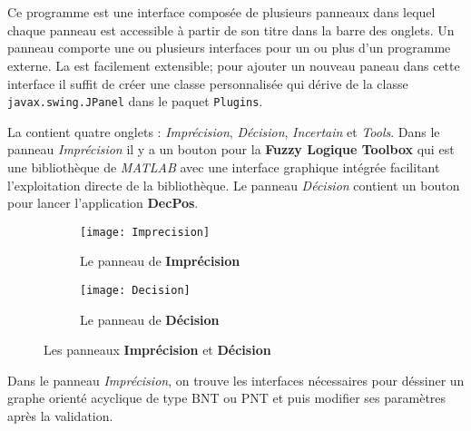 \section{\platformeName}

Ce programme est une interface composée de plusieurs panneaux dans lequel chaque panneau est accessible
à partir de son titre dans la barre des onglets. Un panneau comporte une ou plusieurs interfaces pour
un ou plus d'un programme externe.  La \platformename est facilement extensible; pour ajouter un nouveau
paneau dans cette interface il suffit de créer une classe personnalisée qui dérive de la classe
\mbox{\texttt{javax.swing.JPanel}} dans le paquet \texttt{Plugins}.

La \platformename contient quatre onglets : \textit{Imprécision}, \textit{Décision}, \textit{Incertain}
et \textit{Tools}. Dans le panneau \textit{Imprécision} il y a un bouton pour la \textbf{Fuzzy Logique Toolbox}
qui est une bibliothèque de \textit{MATLAB} avec une interface graphique intégrée facilitant l'exploitation
directe de la bibliothèque. Le panneau \textit{Décision} contient un bouton pour lancer l'application \textbf{DecPos}.

\begin{figure}[H]
\begin{subfigure}{0.49\textwidth}
\texttt{[image: Imprecision]}
\caption{Le panneau de \textbf{Imprécision}}
\end{subfigure}
\hfill
\begin{subfigure}{0.49\textwidth}
\texttt{[image: Decision]}
\caption{Le panneau de \textbf{Décision}}
\end{subfigure}
\caption{Les panneaux \textbf{Imprécision} et \textbf{Décision}}
\end{figure}

Dans le panneau \textit{Imprécision}, on trouve les interfaces nécessaires pour déssiner un graphe orienté acyclique
de type BNT ou PNT et puis modifier ses paramètres après la validation.
